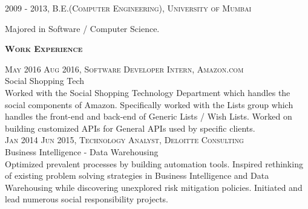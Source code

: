 \documentclass[letterpaper,12pt,final]{memoir}
\newcommand{\SmallSep}{\vspace{0.5em}}
\newcommand{\CVSection}[1]
	{\Large\textbf{\textsc{{#1}}}\par
	\SmallSep\normalsize\normalfont}
\newcommand{\CVItem}[1]
	{\textsc{\color{Plum} #1}}
\begin{document}
\CVItem{2009 - 2013, B.E.(Computer Engineering), University of \allowbreak  Mumbai}\\
 \begin{footnotesize}
 	Majored in Software / Computer Science.
 \end{footnotesize}
\SmallSep

\CVSection{Work Experience}
\CVItem{May 2016 \textendash \space Aug 2016, Software Developer Intern, Amazon.com}\\
\SmallSep
Social Shopping Tech\\
{\footnotesize Worked with the Social Shopping Technology Department which handles the social components of Amazon. Specifically worked with the Lists group which handles the front-end and back-end of Generic Lists / Wish Lists. Worked on building customized APIs for General APIs used by specific clients.}
\SmallSep\\
\CVItem{Jan 2014 \textendash \space Jun 2015, Technology Analyst, Deloitte Consulting}\\
\SmallSep
Business Intelligence - Data Warehousing\\
{\footnotesize Optimized prevalent processes by building automation tools. Inspired rethinking of existing problem solving strategies in Business Intelligence and Data Warehousing while discovering unexplored risk mitigation policies. Initiated and lead numerous social responsibility projects.}
\SmallSep
\end{document}

